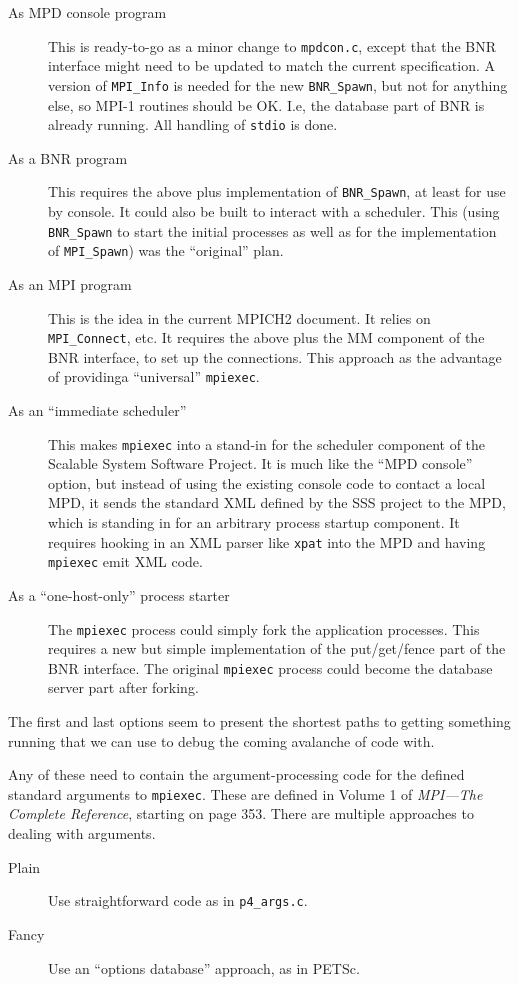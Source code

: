 \documentclass{article}
\def\code#1{\texttt{#1}}
\let\file=\code
\begin{document}
\begin{description}
\item[As MPD console program] This is ready-to-go as a minor change to
  \file{mpdcon.c}, except that the BNR interface might need to be updated to
  match 
  the current specification.  A version of \code{MPI_Info} is needed for the
  new 
  \code{BNR_Spawn}, but not for anything else, so MPI-1 routines should be OK.
  I.e, 
  the database part of BNR is already running.  All handling of \code{stdio}
  is done.
\item[As a BNR program] This requires the above plus implementation of
  \code{BNR_Spawn}, at least for use by console.  It could also be built to
  interact 
  with a scheduler.  This (using \code{BNR_Spawn} to start the initial
  processes as 
  well as for the implementation of \code{MPI_Spawn}) was the ``original''
  plan.
\item[As an MPI program] This is the idea in the current MPICH2 document.  It
  relies on \code{MPI_Connect}, etc.  It requires the above plus the MM
  component 
  of the BNR interface, to set up the connections.  This approach as the
  advantage of providinga ``universal'' \code{mpiexec}. 
\item[As an ``immediate scheduler''] This makes \code{mpiexec} into a stand-in
  for the scheduler component of the Scalable System Software Project.  It is
  much like the ``MPD console'' option, but instead of using the existing
  console code to contact a local MPD, it sends the standard XML defined by
  the SSS project to the MPD, which is standing in for an arbitrary process
  startup component.  It requires hooking in an XML parser like \code{xpat}
  into the MPD and having \code{mpiexec} emit XML code.
\item[As a ``one-host-only'' process starter] The \code{mpiexec} process could
  simply fork the application processes.  This requires a new but simple
  implementation of the put/get/fence part of the BNR interface.  The original
  \code{mpiexec} process could become the database server part after forking.
\end{description}

The first and last options seem to present the shortest paths to getting
something running that we can use to debug the coming avalanche of code with.

Any of these need to contain the argument-processing code for the defined
standard arguments to \code{mpiexec}.  These are defined in Volume 1 of \emph{ MPI---The Complete Reference}, starting on page 353.  There are multiple
approaches to dealing with arguments.
\begin{description}
\item[Plain] Use straightforward code as in \file{p4_args.c}.
\item[Fancy] Use an ``options database'' approach, as in PETSc.
\end{description}
\end{document}
